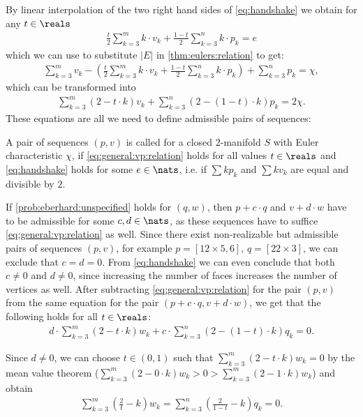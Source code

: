 By linear interpolation of the two right hand sides of \eqref{eq:handshake} we obtain for any $t \in \reals$
\begin{align}
  \frac{t}{2} \sum_{k=3}^m k \cdot v_k + \frac{1-t}{2} \sum_{k=3}^n k \cdot p_k = e \label{eq:interpolated:handshake}
\end{align}
 which we can use to substitute $|E|$ in \autoref{thm:eulers:relation} to get:
\begin{align*}
  \sum_{k=3}^m v_k - \left(\frac{t}{2} \sum_{k=3}^m k \cdot v_k + \frac{1-t}{2} \sum_{k=3}^n k \cdot p_k \right) + \sum_{k=3}^n p_k = \chi,
\end{align*}
which can be transformed into
\begin{align}
  \sum_{k=3}^m (2 - t \cdot k ) v_k + \sum_{k=3}^n ( 2 - (1 - t) \cdot k ) p_k = 2 \chi. \label{eq:general:vp:relation}
\end{align}
These equations are all we need to define admissible pairs of sequences:
\begin{definition} A pair of sequences $(p, v)$ is called  for a closed $2$-manifold $S$ with {\sc Euler} characteristic $\chi$, if \eqref{eq:general:vp:relation} holds for all values $t \in \reals$ and \eqref{eq:handshake} holds for some $e \in \nats$, i.e. if $\sum k p_k$ and $\sum k v_k$ are equal and divisible by $2$.
\end{definition}

If \autoref{prob:eberhard:unspecified} holds for $(q, w)$, then $p + c \cdot q$ and $v + d \cdot w$ have to be admissible for some $c,d \in \nats$, as these sequences have to suffice \eqref{eq:general:vp:relation} as well. Since there exist non-realizable but admissible pairs of sequences $(p, v)$, for example $p = [12 \times 5, 6]$, $q = [22 \times 3]$, we can exclude that $c = d = 0$. From \eqref{eq:handshake} we can even conclude that both $c \neq 0$ and $d \neq 0$, since increasing the number of faces increases the number of vertices as well. After subtracting \eqref{eq:general:vp:relation} for the pair $(p, v)$ from the same equation for the pair $(p + c \cdot q, v + d \cdot w)$, we get that the following holds for all $t \in \reals$:
\begin{align*}
  d \cdot \sum_{k=3}^m \left(2 - t \cdot k \right) w_k + c \cdot \sum_{k=3}^n \left( 2 - (1 - t) \cdot k \right) q_k = 0. 
\end{align*}

Since $d \neq 0$, we can choose $t \in (0, 1)$ such that $\sum_{k=3}^m (2 - t \cdot k) w_k = 0$ by the mean value theorem ($\sum_{k=3}^m (2 - 0 \cdot k) w_k > 0 > \sum_{k=3}^m (2 - 1 \cdot k) w_k$) and obtain
\begin{align}
    \sum_{k=3}^m \left(\frac{2}{t} - k \right) w_k = \sum_{k=3}^n \left( \frac{2}{1-t} - k \right) q_k = 0. \label{eq:qw:flat}
\end{align}

